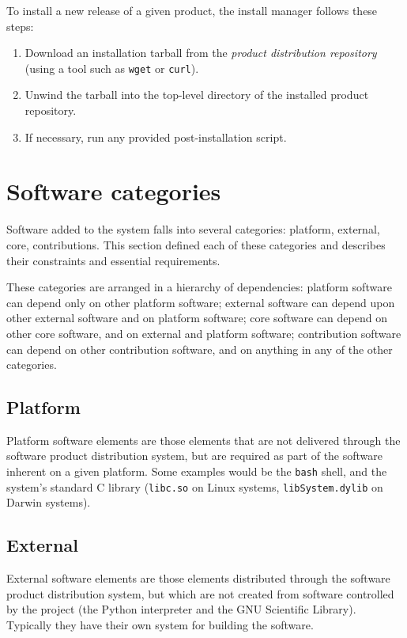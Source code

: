 \documentclass{memarticle}
\newcommand{\prog}[1]%
  {\texttt{#1}}
\begin{document}
To install a new release of a given product, the install manager follows
these steps:
\begin{enumerate}
\item Download an installation tarball from the \emph{product distribution
  repository} (using a tool such as \prog{wget} or \prog{curl}).
\item Unwind the tarball into the top-level directory of the installed
  product repository.
\item If necessary, run any provided post-installation script.
\end{enumerate}

\section{Software categories}

Software added to the system falls into several categories: platform,
external, core, contributions. This section defined each of these
categories and describes their constraints and essential requirements.

These categories are arranged in a hierarchy of dependencies: platform
software can depend only on other platform software; external software
can depend upon other external software and on platform software; core
software can depend on other core software, and on external and platform
software; contribution software can depend on other contribution
software, and on anything in any of the other categories.

\subsection{Platform}

Platform software elements are those elements that are not delivered
through the software product distribution system, but are required as
part of the software inherent on a given platform. Some examples would
be the \prog{bash} shell, and the system's standard C library
(\prog{libc.so} on Linux systems, \prog{libSystem.dylib} on Darwin
systems).

\subsection{External}

External software elements are those elements distributed through the
software product distribution system, but which are not created from
software controlled by the project (\eg the Python interpreter and the
GNU Scientific Library). Typically they have their own system for
building the software.
\end{document}
